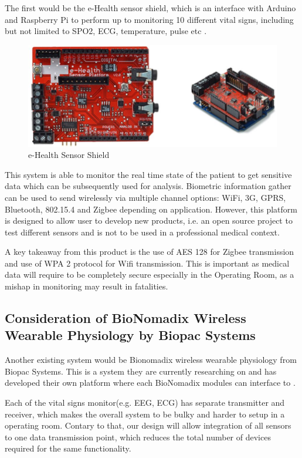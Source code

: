 The first would be the e-Health sensor shield, which is an interface with Arduino and Raspberry Pi to perform up to monitoring 10 different vital signs, including but not limited to SPO2, ECG, temperature, pulse etc \cite{lit9}.

\begin{figure}[H]
	\centering
	\includegraphics[width=0.7\linewidth]{lit4.jpg}
	\caption{e-Health Sensor Shield \cite{lit9}}
	\label{literaturereview4}
\end{figure}

This system is able to monitor the real time state of the patient to get sensitive data which can be subsequently used for analysis. Biometric information gather can be used to send wirelessly via multiple channel options: WiFi, 3G, GPRS, Bluetooth, 802.15.4 and Zigbee depending on application. However, this platform is designed to allow user to develop new products, i.e. an open source project to test different sensors and is not to be used in a professional medical context. 

A key takeaway from this product is the use of AES 128 for Zigbee transmission and use of WPA 2 protocol for Wifi transmission. This is important as medical data will require to be completely secure especially in the Operating Room, as a mishap in monitoring may result in fatalities.

\subsection{Consideration of BioNomadix Wireless Wearable Physiology by Biopac Systems}

Another existing system would be Bionomadix wireless wearable physiology from Biopac Systems. This is a system they are currently researching on and has developed their own platform where each BioNomadix modules can interface to \cite{lit10}. 

Each of the vital signs monitor(e.g. EEG, ECG) has separate transmitter and receiver, which makes the overall system to be bulky and harder to setup in a operating room. Contary to that, our design will allow integration of all sensors to one data transmission point, which reduces the total number of devices required for the same functionality. 


